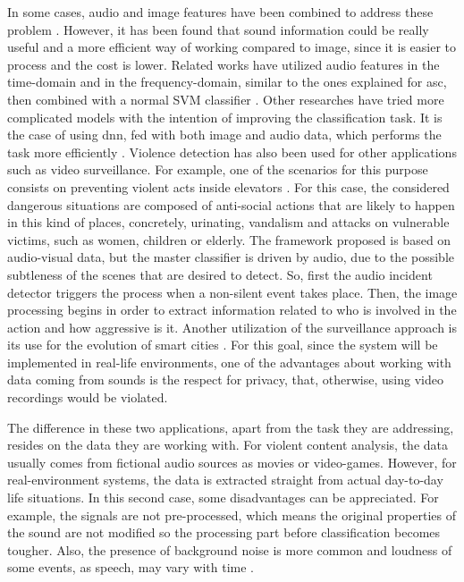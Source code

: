 	In some cases, audio and image features have been combined to address these problem \cite{Giannakopoulos2010}. However, it has been found that sound information could be really useful and a more efficient way of working compared to image, since it is easier to process and the cost is lower. Related works have utilized audio features in the time-domain and in the frequency-domain, similar to the ones explained for \acrshort{asc}, then combined with a normal SVM classifier \cite{Giannakopoulos2006}. Other researches have tried more complicated models with the intention of improving the classification task. It is the case of using \acrshort{dnn}, fed with both image and audio data, which performs the task more efficiently \cite{Ali2018}. Violence detection has also been used for other applications such as video surveillance. For example, one of the scenarios for this purpose consists on preventing violent acts inside elevators \cite{Chua2014}. For this case, the considered dangerous situations are composed of anti-social actions that are likely to happen in this kind of places, concretely, urinating, vandalism and attacks on vulnerable victims, such as women, children or elderly. The framework proposed is based on audio-visual data, but the master classifier is driven by audio, due to the possible subtleness of the scenes that are desired to detect. So, first the audio incident detector triggers the process when a non-silent event takes place. Then, the image processing begins in order to extract information related to who is involved in the action and how aggressive is it. Another utilization of the surveillance approach is its use for the evolution of smart cities \cite{Garcia-Gomez2016}. For this goal, since the system will be implemented in real-life environments, one of the advantages about working with data coming from sounds is the respect for privacy, that, otherwise, using video recordings would be violated.
	
	The difference in these two applications, apart from the task they are addressing, resides on the data they are working with. For violent content analysis, the data usually comes from fictional audio sources as movies or video-games. However, for real-environment systems, the data is extracted straight from actual day-to-day life situations. In this second case, some disadvantages can be appreciated. For example, the signals are not pre-processed, which means the original properties of the sound are not modified so the processing part before classification becomes tougher. Also, the presence of background noise is more common and loudness of some events, as speech, may vary with time \cite{Bautista-Duran2017}.

